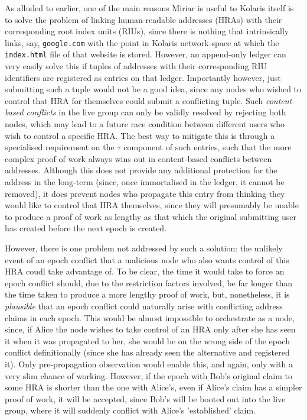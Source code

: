 \documentclass{extreport}
\begin{document}
As alluded to earlier, one of the main reasons Miriar is useful to Kolaris itself is to solve the problem of linking human-readable addresses (HRAs) with their corresponding root index units (RIUs), since there is nothing that intrinsically links, say, \texttt{google.com} with the point in Kolaris network-space at which the \texttt{index.html} file of that website is stored. However, an append-only ledger can very easily solve this if tuples of addresses with their corresponding RIU identifiers are registered as entries on that ledger. Importantly however, just submitting such a tuple would not be a good idea, since any nodes who wished to control that HRA for themselves could submit a conflicting tuple. Such \emph{content-based conflicts} in the live group can only be validly resolved by rejecting both nodes, which may lead to a future race condition between different users who wish to control a specific HRA. The best way to mitigate this is through a specialised requirement on the \(\tau\) component of such entries, such that the more complex proof of work always wins out in content-based conflicts between addresses. Although this does not provide any additional protection for the address in the long-term (since, once immortalised in the ledger, it cannot be removed), it does prevent nodes who propagate this entry from thinking they would like to control that HRA themselves, since they will presumably be unable to produce a proof of work as lengthy as that which the original submitting user has created before the next epoch is created.

However, there is one problem not addressed by such a solution: the unlikely event of an epoch conflict that a malicious node who also wants control of this HRA coudl take advantage of. To be clear, the time it would take to force an epoch conflict should, due to the restriction factors involved, be far longer than the time taken to produce a more lengthy proof of work, but, nonetheless, it is \emph{plausible} that an epoch conflict could naturally arise with conflicting address claims in each epoch. This would be almost impossible to orchestrate as a node, since, if Alice the node wishes to take control of an HRA only after she has seen it when it was propagated to her, she would be on the wrong side of the epoch conflict definitionally (since she has already seen the alternative and registered it). Only pre-propagation observation would enable this, and again, only with a very slim chance of working. However, if the epoch with Bob's original claim to some HRA is shorter than the one with Alice's, even if Alice's claim has a simpler proof of work, it will be accepted, since Bob's will be booted out into the live group, where it will suddenly conflict with Alice's 'established' claim.
\end{document}
